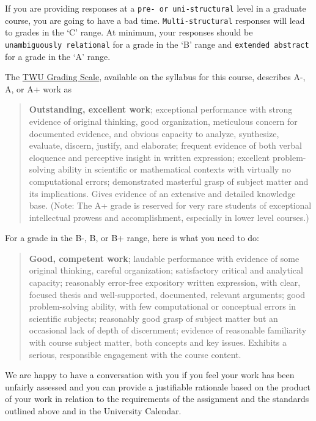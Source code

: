\documentclass[
]{book}
\begin{document}
If you are providing responses at a \texttt{pre-\ or\ uni-structural} level in a graduate course, you are going to have a bad time. \texttt{Multi-structural} responses will lead to grades in the `C' range. At minimum, your responses should be \texttt{unambiguously\ relational} for a grade in the `B' range and \texttt{extended\ abstract} for a grade in the `A' range.

The \href{https://www.twu.ca/about/policies-guidelines/university-standard-grading-system}{TWU Grading Scale}, available on the syllabus for this course, describes A-, A, or A+ work as

\begin{quote}
\textbf{Outstanding, excellent work}; exceptional performance with strong evidence of original thinking, good organization, meticulous concern for documented evidence, and obvious capacity to analyze, synthesize, evaluate, discern, justify, and elaborate; frequent evidence of both verbal eloquence and perceptive insight in written expression; excellent problem-solving ability in scientific or mathematical contexts with virtually no computational errors; demonstrated masterful grasp of subject matter and its implications. Gives evidence of an extensive and detailed knowledge base. (Note: The A+ grade is reserved for very rare students of exceptional intellectual prowess and accomplishment, especially in lower level courses.)
\end{quote}

For a grade in the B-, B, or B+ range, here is what you need to do:

\begin{quote}
\textbf{Good, competent work}; laudable performance with evidence of some original thinking, careful organization; satisfactory critical and analytical capacity; reasonably error-free expository written expression, with clear, focused thesis and well-supported, documented, relevant arguments; good problem-solving ability, with few computational or conceptual errors in scientific subjects; reasonably good grasp of subject matter but an occasional lack of depth of discernment; evidence of reasonable familiarity with course subject matter, both concepts and key issues. Exhibits a serious, responsible engagement with the course content.
\end{quote}

We are happy to have a conversation with you if you feel your work has been unfairly assessed and you can provide a justifiable rationale based on the product of your work in relation to the requirements of the assignment and the standards outlined above and in the University Calendar.
\end{document}
